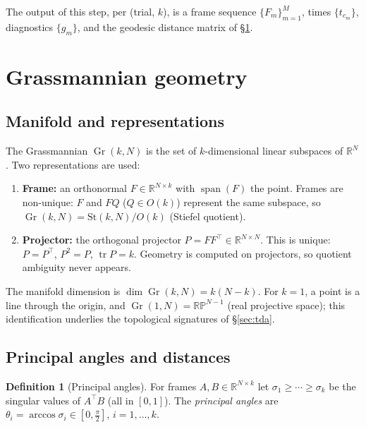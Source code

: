 \documentclass[11pt]{article}
\newcommand{\R}{\mathbb{R}}
\newcommand{\Gr}{\operatorname{Gr}}
\newcommand{\RP}{\mathbb{RP}}
\newcommand{\tr}{\operatorname{tr}}
\newcommand{\Span}{\operatorname{span}}
\theoremstyle{definition}
\newtheorem{definition}{Definition}
\begin{document}
The output of this step, per (trial, $k$), is a frame sequence
$\{F_m\}_{m=1}^{M}$, times $\{t_{c_m}\}$, diagnostics $\{g_m\}$, and the geodesic
distance matrix of \S\ref{sec:geom}.

\section{Grassmannian geometry}
\label{sec:geom}

\subsection{Manifold and representations}
The Grassmannian $\Gr(k,N)$ is the set of $k$-dimensional linear subspaces of
$\R^N$. Two representations are used:
\begin{enumerate}[leftmargin=1.4em]
\item \textbf{Frame:} an orthonormal $F\in\R^{N\times k}$ with $\Span(F)$ the point.
Frames are non-unique: $F$ and $FQ$ ($Q\in O(k)$) represent the same subspace, so
$\Gr(k,N) = \mathrm{St}(k,N)/O(k)$ (Stiefel quotient).
\item \textbf{Projector:} the orthogonal projector $P = FF^\top\in\R^{N\times N}$.
This is unique: $P=P^\top$, $P^2=P$, $\tr P = k$. Geometry is computed on projectors,
so quotient ambiguity never appears.
\end{enumerate}
The manifold dimension is $\dim\Gr(k,N)=k(N-k)$. For $k=1$, a point is a line through
the origin, and $\Gr(1,N)=\RP^{N-1}$ (real projective space); this identification
underlies the topological signatures of \S\ref{sec:tda}.

\subsection{Principal angles and distances}
\begin{definition}[Principal angles]
For frames $A,B\in\R^{N\times k}$ let $\sigma_1\ge\cdots\ge\sigma_k$ be the singular
values of $A^\top B$ (all in $[0,1]$). The \emph{principal angles} are
$\theta_i = \arccos\sigma_i \in [0,\tfrac{\pi}{2}]$, $i=1,\dots,k$.
\end{definition}
\end{document}
